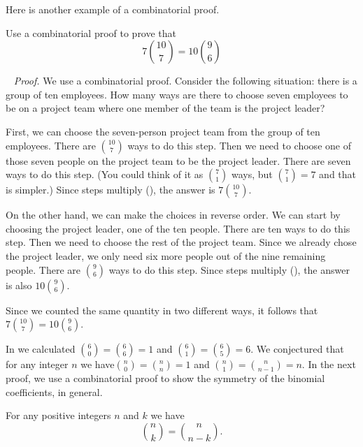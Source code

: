 Here is another example of a combinatorial proof.

\begin{exam} 
\label{exam_comb_proof_teamandleader}
    Use a combinatorial proof to prove that 
    $$\displaystyle 7\binom{10}{7} = 10 \binom{9}{6}$$

    \begin{soln}
    ~
        \emph{Proof.} We use a combinatorial proof.  Consider the following situation: there is a group of ten employees.  How many ways are there to choose seven employees to be on a project team where one member of the team is the project leader?

        First, we can choose the seven-person project team from the group of ten employees.  There are $\binom{10}{7}$ ways to do this step.  Then we need to choose one of those seven people on the project team to be the project leader.  There are seven ways to do this step. (You could think of it as $\binom{7}{1}$ ways, but $\binom{7}{1}= 7$ and that is simpler.)  Since steps multiply (), the answer is $7\binom{10}{7}$. 

        On the other hand, we can make the choices in reverse order.  We can start by choosing the project leader, one of the ten people.  There are ten ways to do this step.  Then we need to choose the rest of the project team.  Since we already chose the project leader, we only need six more people out of the nine remaining people.  There are $\binom{9}{6}$ ways to do this step.  Since steps multiply (), the answer is also $10 \binom{9}{6}$.

        Since we counted the same quantity in two different ways, it follows that $7\binom{10}{7} = 10\binom{9}{6}$. \hfill 
    \end{soln}
\end{exam}

In  we calculated $\binom{6}{0}=\binom{6}{6}=1$ and $\binom{6}{1}=\binom{6}{5}=6$.  We conjectured that for any integer $n$ we have$ \binom{n}{0}=\binom{n}{n}=1$ and $\binom{n}{1}=\binom{n}{n-1}=n$. In the next proof, we use a combinatorial proof to show the symmetry of the binomial coefficients, in general.

\begin{thm}
\label{thm_sym_binom}
    For any positive integers $n$ and $k$ we have
    $$\binom{n}{k}=\binom{n}{n-k}.$$
\end{thm}

